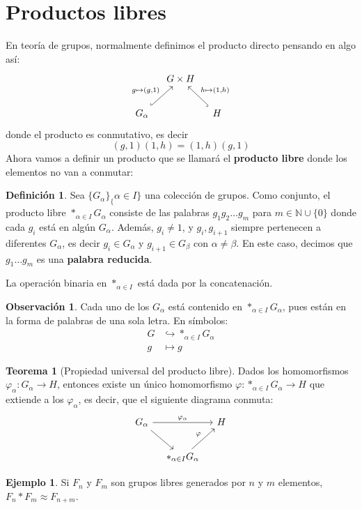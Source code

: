 \documentclass[spanish]{book}
\theoremstyle{definition}
\newtheorem*{defn}{Definición}
\newtheorem*{obs}{Observación}
\newtheorem*{teo}{Teorema}
\newtheorem*{ejem}{Ejemplo}
\newcommand{\N}{\mathbb{N}}
\begin{document}
\section{Productos libres}
	En teoría de grupos, normalmente definimos el producto directo pensando en algo así: 
	\[\begin{tikzcd}[column sep=1em, row sep=2em]
		&G\times H\\
		G_\alpha\arrow[ur,hook,"g\mapsto(g\text{,}1)"]&&H \arrow[ul,hook,swap,"h\mapsto(1\text{,}h)"]
	\end{tikzcd}\]
	donde el producto es conmutativo, es decir \[(g,1)(1,h)=(1,h)(g,1)\]
	Ahora vamos a definir un producto que se llamará el \textbf{producto libre} donde los elementos no van a conmutar:
	\begin{defn}
		Sea $\{G_\alpha\}_\{\alpha\in I\}$ una colección de grupos. Como conjunto, el producto libre $\ast_{\alpha\in I}G_\alpha$ consiste de las palabras $g_1g_2\ldots g_m$ para $m\in\N\cup\{0\}$ donde cada $g_i$ está en algún $G_\alpha$. Además, $g_i\neq1$, y $g_i,g_{i+1}$ siempre pertenecen a diferentes $G_\alpha$, es decir $g_i\in G_\alpha$ y $g_{i+1}\in G_\beta$ con $\alpha\neq\beta$. En este caso, decimos que $g_1\ldots g_m$ es una \textbf{palabra reducida}.
		
		La operación binaria en $\ast_{\alpha\in I}$ está dada por la concatenación.
	\end{defn}
	\begin{obs}
		Cada uno de los $G_\alpha$ está contenido en $\ast_{\alpha\in I}G_\alpha$, pues están en la forma de palabras de una sola letra. En símbolos:
		\begin{align*}
			G&\hookrightarrow\ast_{\alpha\in I}G_\alpha\\
			g&\mapsto g
		\end{align*}
	\end{obs}
	\begin{teo}[Propiedad universal del producto libre]
		Dados los homomorfismos $\varphi_\alpha:G_\alpha\to H$, entonces existe un único homomorfismo $\varphi:\ast_{\alpha\in I}G_\alpha\to H$ que extiende a los $\varphi_\alpha$, es decir, que el siguiente diagrama conmuta:
		\[\begin{tikzcd}[column sep=1em, row sep=2em]
			G_\alpha\arrow[rr,"\varphi_\alpha"]\arrow[dr]&&H\\
			&\ast_{\alpha\in I}G_\alpha \arrow[ur,"\varphi"]
		\end{tikzcd}\]
	\end{teo}
	\begin{ejem}
		Si $F_n$ y $F_m$ son grupos libres generados por $n$ y $m$ elementos, $F_n*F_m\approx F_{n+m}$.
	\end{ejem}
\end{document}
